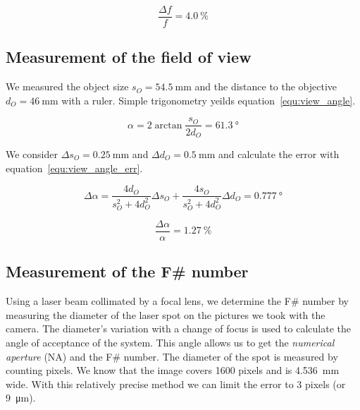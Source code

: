 \documentclass[a4paper, 12pt]{paper}
\begin{document}
\begin{equation}
    \frac{\Delta f}{f} = \SI{4.0}{\percent}
    \label{equ:focal_length_err_percent}
\end{equation}

\subsection{Measurement of the field of view}
We measured the object size $s_O = \SI{54.5}{\milli\meter}$ and the distance to the objective $d_O = \SI{46}{\milli\meter}$ with a ruler.
Simple trigonometry yeilds equation~\ref{equ:view_angle}.

\begin{equation}
    \alpha = 2 \arctan{\frac{s_O}{2 d_O}} = \SI{61.3}{\degree}
    \label{equ:view_angle}
\end{equation}

We consider $\Delta s_O = \SI{0.25}{\milli\meter}$ and $\Delta d_O = \SI{0.5}{\milli\meter}$ and calculate the error with equation~\ref{equ:view_angle_err}.

\begin{equation}
    \Delta \alpha = \frac{4 d_O}{s_O^2 + 4 d_O^2} \Delta s_O
    + \frac{4 s_O}{s_O^2 + 4 d_O^2} \Delta d_O = \SI{0.777}{\degree}
    \label{equ:view_angle_err}
\end{equation}

\begin{equation}
    \frac{\Delta \alpha}{\alpha} = \SI{1.27}{\percent}
    \label{equ:view_angle_err_percent}
\end{equation}

\subsection{Measurement of the F\# number}
Using a laser beam collimated by a focal lens, we determine the F\# number by measuring the diameter of the laser spot on the pictures we took with the camera.
The diameter's variation with a change of focus is used to calculate the angle of acceptance of the system.
This angle allows us to get the \emph{numerical aperture} (NA) and the F\# number.
The diameter of the spot is measured by counting pixels.
We know that the image covers 1600 pixels and is \SI{4.536}{\milli\meter} wide.
With this relatively precise method we can limit the error to 3 pixels (or \SI{9}{\micro\meter}).
\end{document}
